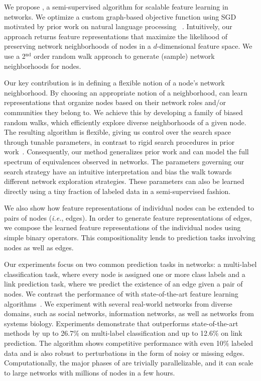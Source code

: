 We propose \nodevec, a semi-supervised algorithm for scalable feature learning in networks. We optimize
a custom graph-based objective function using SGD motivated by prior work on natural language processing 
~\cite{word2vec}.
Intuitively, our approach returns feature representations that maximize the likelihood of preserving network neighborhoods of nodes in a $d$-dimensional feature space. 
We use a 2$^{\textrm{nd}}$ order random walk approach to generate (sample) network neighborhoods for nodes.

Our key contribution is in defining a flexible notion of a node's network neighborhood. By choosing an appropriate notion of a neighborhood, \nodevec can learn representations that organize nodes based on their network roles and/or communities they belong to. We achieve this by developing a family of biased random walks, which efficiently explore diverse neighborhoods of a given node. 
The resulting algorithm is flexible, giving us control over the search space through tunable parameters, in contrast to rigid search procedures in prior work~\cite{deepwalk, line}. Consequently, our method generalizes prior work and can model the full spectrum of equivalences observed in networks. The parameters governing our search strategy have an intuitive interpretation and bias the walk towards different network exploration strategies. These parameters can also be learned directly using a tiny fraction of labeled data in a semi-supervised fashion.

We also show how feature representations of individual nodes can be extended to pairs of nodes ({\em i.e.}, edges). In order to generate feature representations of edges, we compose the learned feature representations of the individual nodes using simple binary operators. This compositionality lends \nodevec to prediction tasks involving nodes as well as edges. 

Our experiments focus on two common prediction tasks in networks: a multi-label classification task, where every node is assigned one or more class labels and a link prediction task, where we predict the existence of an edge given a pair of nodes.
We contrast the performance of \nodevec with state-of-the-art feature learning algorithms~\cite{deepwalk, line}.
We experiment with several real-world networks from diverse domains, such as social networks, information networks, as well as networks from systems biology. Experiments demonstrate that \nodevec outperforms state-of-the-art methods by up to 26.7\% on multi-label classification and up to 12.6\% on link prediction. The algorithm shows competitive performance with even 10\% labeled data and is also robust to perturbations in the form of noisy or missing edges. Computationally, the major phases of \nodevec are trivially parallelizable, and it can scale to large networks with millions of nodes in a few hours.

